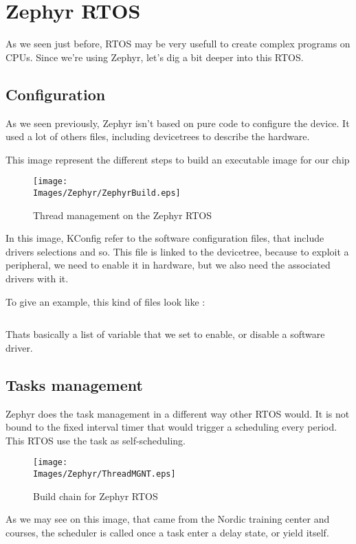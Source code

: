 \section{Zephyr RTOS}
As we seen just before, RTOS may be very usefull to create complex programs on CPUs.
Since we're using Zephyr, let's dig a bit deeper into this RTOS.

\subsection{Configuration}
As we seen previously, Zephyr isn't based on pure code to configure the device. It used
a lot of others files, including devicetrees to describe the hardware.

This image represent the different steps to build an executable image for our chip
\begin{figure}[!hbt]
    \centering
    \texttt{[image: \\Images/Zephyr/ZephyrBuild.eps]}
    \caption{Thread management on the Zephyr RTOS}
\end{figure}
\FloatBarrier

In this image, KConfig refer to the software configuration files, that include
drivers selections and so. This file is linked to the devicetree, because to
exploit a peripheral, we need to enable it in hardware, but we also need the associated
drivers with it.

To give an example, this kind of files look like :
\inputminted[linenos, firstline=32, lastline=70]{kconfig}{\Conf/prj.conf}

Thats basically a list of variable that we set to enable, or disable a software driver.

\subsection{Tasks management}
Zephyr does the task management in a different way other RTOS would. It is not bound to
the fixed interval timer that would trigger a scheduling every period. This RTOS use the
task as self-scheduling.

\begin{figure}[!hbt]
    \centering
    \texttt{[image: \\Images/Zephyr/ThreadMGNT.eps]}
    \caption{Build chain for Zephyr RTOS}
\end{figure}
\FloatBarrier

As we may see on this image, that came from the Nordic training center \cite{NordicFundamentals}
and \cite{NordicAdvanced} courses, the scheduler is called once a task enter a delay state, or
yield itself.

